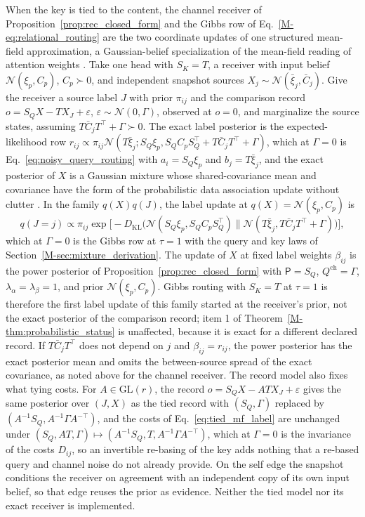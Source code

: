 \documentclass[twoside,11pt]{article}
\begin{document}
\begin{remark}
\label{rem:tied_record}
When the key is tied to the content, the channel receiver of Proposition~\ref{prop:rec_closed_form} and the Gibbs row of Eq.~\eqref{M-eq:relational_routing} are the two coordinate updates of one structured mean-field approximation, a Gaussian-belief specialization of the mean-field reading of attention weights \citep{Singh2023ImplicitStructuralInference}. Take one head with $S_K=T$, a receiver with input belief $\mathcal N(\xi_p,C_p)$, $C_p\succ0$, and independent snapshot sources $X_j\sim\mathcal N(\bar\xi_j,\bar C_j)$. Give the receiver a source label $J$ with prior $\pi_{ij}$ and the comparison record $o=S_QX-TX_J+\varepsilon$, $\varepsilon\sim\mathcal N(0,\Gamma)$, observed at $o=0$, and marginalize the source states, assuming $T\bar C_jT^\top+\Gamma\succ0$. The exact label posterior is the expected-likelihood row $r_{ij}\propto\pi_{ij}\mathcal N(T\bar\xi_j;S_Q\xi_p,S_QC_pS_Q^\top+T\bar C_jT^\top+\Gamma)$, which at $\Gamma=0$ is Eq.~\eqref{eq:noisy_query_routing} with $a_i=S_Q\xi_p$ and $b_j=T\bar\xi_j$, and the exact posterior of $X$ is a Gaussian mixture whose shared-covariance mean and covariance have the form of the probabilistic data association update without clutter \citep{BarShalom1975PDAF}. In the family $q(X)q(J)$, the label update at $q(X)=\mathcal N(\xi_p,C_p)$ is
\begin{equation}
q(J=j)\propto\pi_{ij}\exp\bigl[-D_{\mathrm{KL}}\bigl(\mathcal N(S_Q\xi_p,S_QC_pS_Q^\top)\big\|\mathcal N(T\bar\xi_j,T\bar C_jT^\top+\Gamma)\bigr)\bigr],
\label{eq:tied_mf_label}
\end{equation}
which at $\Gamma=0$ is the Gibbs row at $\tau=1$ with the query and key laws of Section~\ref{M-sec:mixture_derivation}. The update of $X$ at fixed label weights $\beta_{ij}$ is the power posterior of Proposition~\ref{prop:rec_closed_form} with $\mathsf P=S_Q$, $Q^{\mathrm{ch}}=\Gamma$, $\lambda_\alpha=\lambda_\beta=1$, and prior $\mathcal N(\xi_p,C_p)$. Gibbs routing with $S_K=T$ at $\tau=1$ is therefore the first label update of this family started at the receiver's prior, not the exact posterior of the comparison record; item 1 of Theorem~\ref{M-thm:probabilistic_status} is unaffected, because it is exact for a different declared record. If $T\bar C_jT^\top$ does not depend on $j$ and $\beta_{ij}=r_{ij}$, the power posterior has the exact posterior mean and omits the between-source spread of the exact covariance, as noted above for the channel receiver. The record model also fixes what tying costs. For $A\in\mathrm{GL}(r)$, the record $o=S_QX-ATX_J+\varepsilon$ gives the same posterior over $(J,X)$ as the tied record with $(S_Q,\Gamma)$ replaced by $(A^{-1}S_Q,A^{-1}\Gamma A^{-\top})$, and the costs of Eq.~\eqref{eq:tied_mf_label} are unchanged under $(S_Q,AT,\Gamma)\mapsto(A^{-1}S_Q,T,A^{-1}\Gamma A^{-\top})$, which at $\Gamma=0$ is the invariance of the costs $D_{ij}$, so an invertible re-basing of the key adds nothing that a re-based query and channel noise do not already provide. On the self edge the snapshot conditions the receiver on agreement with an independent copy of its own input belief, so that edge reuses the prior as evidence. Neither the tied model nor its exact receiver is implemented.
\end{remark}
\end{document}
